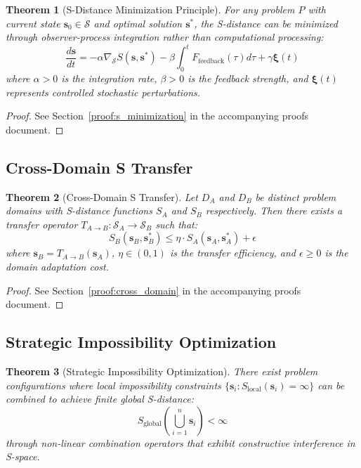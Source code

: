\documentclass[12pt,a4paper]{article}
\newtheorem{theorem}{Theorem}
\begin{document}
\begin{theorem}[S-Distance Minimization Principle]
\label{thm:s_minimization}
For any problem $P$ with current state $\mathbf{s}_0 \in \mathcal{S}$ and optimal solution $\mathbf{s}^*$, the S-distance can be minimized through observer-process integration rather than computational processing:
\begin{equation}
\frac{d\mathbf{s}}{dt} = -\alpha \nabla_{\mathcal{S}} S(\mathbf{s}, \mathbf{s}^*) - \beta \int_0^t F_{\text{feedback}}(\tau) d\tau + \gamma \mathbf{\xi}(t)
\end{equation}
where $\alpha > 0$ is the integration rate, $\beta > 0$ is the feedback strength, and $\mathbf{\xi}(t)$ represents controlled stochastic perturbations.
\end{theorem}

\begin{proof}
See Section~\ref{proof:s_minimization} in the accompanying proofs document.
\end{proof}

\subsection{Cross-Domain S Transfer}

\begin{theorem}[Cross-Domain S Transfer]
\label{thm:cross_domain}
Let $D_A$ and $D_B$ be distinct problem domains with S-distance functions $S_A$ and $S_B$ respectively. Then there exists a transfer operator $T_{A \to B}: \mathcal{S}_A \to \mathcal{S}_B$ such that:
\begin{equation}
S_B(\mathbf{s}_B, \mathbf{s}_B^*) \leq \eta \cdot S_A(\mathbf{s}_A, \mathbf{s}_A^*) + \epsilon
\end{equation}
where $\mathbf{s}_B = T_{A \to B}(\mathbf{s}_A)$, $\eta \in (0, 1)$ is the transfer efficiency, and $\epsilon \geq 0$ is the domain adaptation cost.
\end{theorem}

\begin{proof}
See Section~\ref{proof:cross_domain} in the accompanying proofs document.
\end{proof}

\subsection{Strategic Impossibility Optimization}

\begin{theorem}[Strategic Impossibility Optimization]
\label{thm:strategic_impossibility}
There exist problem configurations where local impossibility constraints $\{\mathbf{s}_i : S_{\text{local}}(\mathbf{s}_i) = \infty\}$ can be combined to achieve finite global S-distance:
\begin{equation}
S_{\text{global}}\left(\bigcup_{i=1}^n \mathbf{s}_i\right) < \infty
\end{equation}
through non-linear combination operators that exhibit constructive interference in S-space.
\end{theorem}
\end{document}
